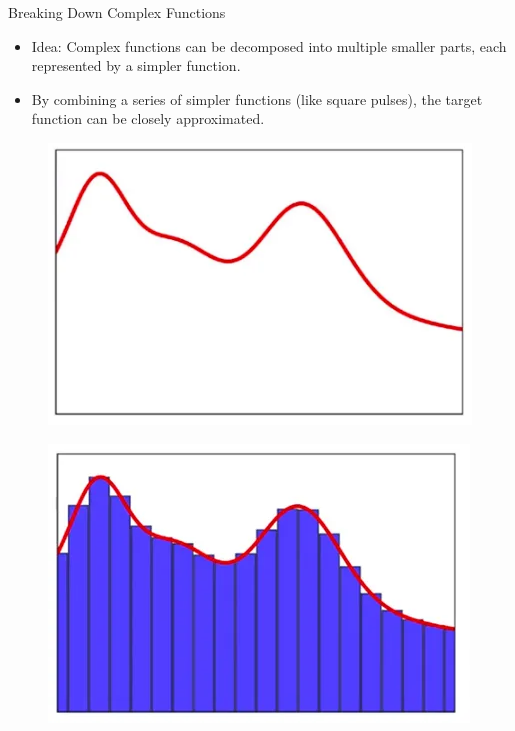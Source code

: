 \documentclass[serif, aspectratio=169]{beamer}
\begin{document}
\begin{frame}{Breaking Down Complex Functions}
	\begin{itemize}
		\item Idea: Complex functions can be decomposed into multiple smaller parts, each represented by a simpler function.
		\item By combining a series of simpler functions (like square pulses), the target function can be closely approximated.
	\end{itemize}

		\begin{figure}[h!]
		\centering
		\begin{minipage}{0.43\textwidth}
			\centering
			\includegraphics[width=\linewidth]{pic/approximator-1.png}
			\label{fig:fig1}
		\end{minipage} \hfill
		\begin{minipage}{0.44\textwidth}
			\centering
			\includegraphics[width=\linewidth]{pic/approximator-2.png}
			\label{fig:fig2}
		\end{minipage}
	\end{figure}
	

\end{frame}
\end{document}
